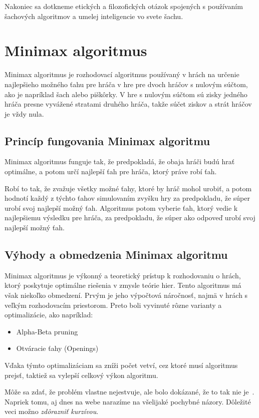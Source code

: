 \documentclass[10pt,twoside,slovak,a4paper]{article}
\begin{document}
Nakoniec sa dotkneme etických a filozofických otázok spojených s používaním šachových algoritmov a umelej inteligencie vo svete šachu.


\section{Minimax algoritmus} \label{minimax}
Minimax algoritmus je rozhodovací algoritmus používaný v hrách na určenie najlepšieho možného ťahu pre hráča v hre pre dvoch hráčov s nulovým súčtom, ako je napríklad šach alebo piškôrky. V hre s nulovým súčtom sú zisky jedného hráča presne vyvážené stratami druhého hráča, takže súčet ziskov a strát hráčov je vždy nula. 

\subsection{Princíp fungovania Minimax algoritmu} \label{principMinimax}
Minimax algoritmus funguje tak, že predpokladá, že obaja hráči budú hrať optimálne, a potom určí najlepší ťah pre hráča, ktorý práve robí ťah. 

Robí to tak, že zvažuje všetky možné ťahy, ktoré by hráč mohol urobiť, a potom hodnotí každý z týchto ťahov simulovaním zvyšku hry za predpokladu, že súper urobí svoj najlepší možný ťah. Algoritmus potom vyberie ťah, ktorý vedie k najlepšiemu výsledku pre hráča, za predpokladu, že súper ako odpoveď urobí svoj najlepší možný ťah.


\subsection{Výhody a obmedzenia Minimax algoritmu} \label {vyhodyMinimax}

Minimax algoritmus je výkonný a teoretický prístup k rozhodovaniu o hrách, ktorý poskytuje optimálne riešenia v zmysle teórie hier. Tento algoritmus má však niekoľko obmedzení. Prvým je jeho výpočtová náročnosť, najmä v hrách s veľkým rozhodovacím priestorom. Preto boli vyvinuté rôzne varianty a optimalizácie, ako napríklad:
\begin{itemize}
\item Alpha-Beta pruning
\item Otváracie ťahy (Openings)
\end{itemize}
Vďaka týmto optimalizáciam sa zníži počet vetví, cez ktoré musí algoritmus prejsť, taktiež sa vylepší celkový výkon algoritmu. 


Môže sa zdať, že problém vlastne nejestvuje\cite{Coplien:MPD}, ale bolo dokázané, že to tak nie je~\cite{Czarnecki:Staged, Czarnecki:Progress}. Napriek tomu, aj dnes na webe narazíme na všelijaké pochybné názory\cite{PLP-Framework}. Dôležité veci možno \emph{zdôrazniť kurzívou}.
\end{document}

